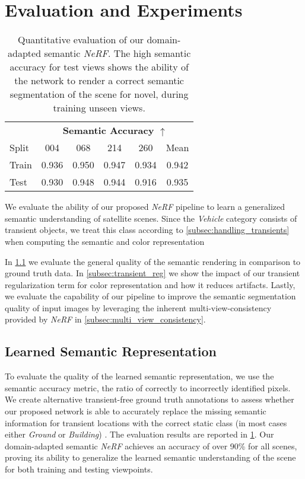 \section{Evaluation and Experiments}

\begin{table}[t]
	\centering
	\setlength{\tabcolsep}{0.5em} %
	\begin{tabular}{l|cccc|c}
		\toprule
		& \multicolumn{5}{c}{\textbf{Semantic Accuracy $\uparrow$}} \\
		Split &004&068&214&260& Mean\\
		\midrule
		
		Train & 0.936 & 0.950 & 0.947 & 0.934& 0.942 \\
		Test & 0.930 & 0.948 & 0.944 & 0.916& 0.935\\
		
		\bottomrule
	\end{tabular}
	\caption{Quantitative evaluation of our domain-adapted semantic \emph{NeRF}. The high semantic accuracy for test views shows the ability of the network to render a correct semantic segmentation of the scene for novel, during training unseen views. }
	\label{tbl:semantic_results}
\end{table}

We evaluate the ability of our proposed \emph{NeRF} pipeline to learn a generalized semantic understanding of satellite scenes. 
Since the \emph{Vehicle} category consists of transient objects, we treat this class according to \cref{subsec:handling_transients} when computing the semantic and color representation

In \cref{subsec:learned_semantic_rep} we evaluate the general quality of the semantic rendering in comparison to ground truth data. In \cref{subsec:transient_reg} we show the impact of our transient regularization term for color representation and how it reduces artifacts. 
Lastly, we evaluate the capability of our pipeline to improve the semantic segmentation quality of input images by leveraging the inherent multi-view-consistency provided by \emph{NeRF} in \cref{subsec:multi_view_consistency}.



\subsection{Learned Semantic Representation}
\label{subsec:learned_semantic_rep}

To evaluate the quality of the learned semantic representation, we use the semantic accuracy metric, \ie the ratio of correctly to incorrectly identified pixels. 
We create alternative transient-free ground truth annotations to assess whether our proposed network is able to accurately replace the missing semantic information for transient locations with the correct static class (in most cases either \emph{Ground} or \emph{Building}) . 
The evaluation results are reported in \cref{tbl:semantic_results}.
Our domain-adapted semantic \emph{NeRF} achieves an accuracy of over 90\% for all scenes, proving its ability to generalize the learned semantic understanding of the scene for both training and testing viewpoints. 


